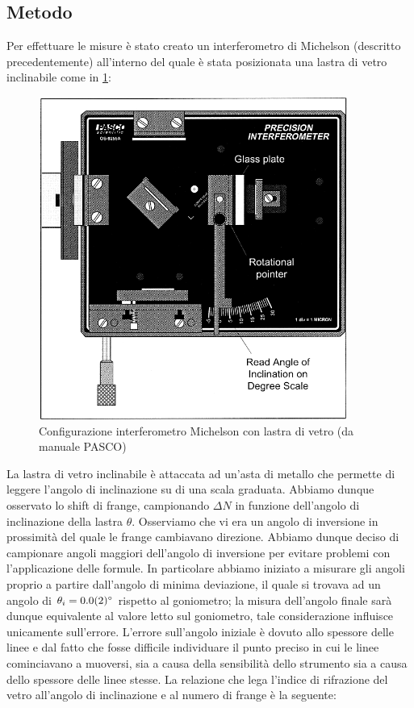\documentclass[a4paper]{article}
\begin{document}
\subsection{Metodo}
Per effettuare le misure è stato creato un interferometro di Michelson (descritto precedentemente) all'interno del quale è stata posizionata una lastra di vetro inclinabile come in \cref{fig:michelson-vetro}:
\begin{figure}[htbp]
\centering
\includegraphics[width=0.9\textwidth]{./grafici/Michaelson vetro.png}
\caption{Configurazione interferometro Michelson con lastra di vetro (da manuale PASCO)}
\label{fig:michelson-vetro}
\end{figure}
La lastra di vetro inclinabile è attaccata ad un'asta di metallo che permette di leggere l'angolo di inclinazione su di una scala graduata. Abbiamo dunque osservato lo shift di frange, campionando $\Delta N$ in funzione dell'angolo di inclinazione della lastra $\theta$. Osserviamo che vi era un angolo di inversione in prossimità del quale le frange cambiavano direzione. Abbiamo dunque deciso di campionare angoli maggiori dell'angolo di inversione per evitare problemi con l'applicazione delle formule. In particolare abbiamo iniziato a misurare gli angoli proprio a partire dall'angolo di minima deviazione, il quale si trovava ad un angolo di $\theta_i = \SI{0 \pm 0.2}{\degree}$ rispetto al goniometro; la misura dell'angolo finale sarà dunque equivalente al valore letto sul goniometro, tale considerazione influisce unicamente sull'errore. L'errore sull'angolo iniziale è dovuto allo spessore delle linee e dal fatto che fosse difficile individuare il punto preciso in cui le linee cominciavano a muoversi, sia a causa della sensibilità dello strumento sia a causa dello spessore delle linee stesse. La relazione che lega l'indice di rifrazione del vetro all'angolo di inclinazione e al numero di frange è la seguente:
\end{document}
